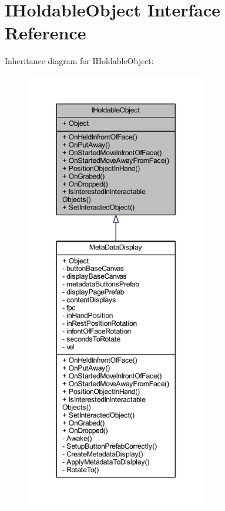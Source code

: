 \hypertarget{interface_i_holdable_object}{}\section{I\+Holdable\+Object Interface Reference}
\label{interface_i_holdable_object}


Inheritance diagram for I\+Holdable\+Object\+:
\nopagebreak
\begin{figure}[H]
\begin{center}
\leavevmode
\includegraphics[height=550pt]{interface_i_holdable_object__inherit__graph}
\end{center}
\end{figure}


